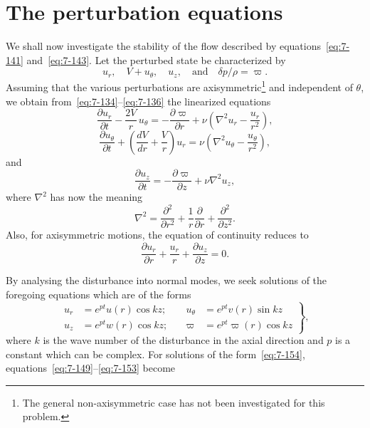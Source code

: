 
\section{The perturbation equations}\label{sec:7-70}
We shall now investigate the stability of the flow described by equations~\eqref{eq:7-141} and~\eqref{eq:7-143}.  Let the perturbed state be characterized by
\begin{equation}
\label{eq:7-148}
u_r, \quad V\!+\!u_\theta, \quad u_z, \quad \text{and} \quad
\delta p/\rho = \varpi.
\end{equation}
Assuming that the various perturbations are axisymmetric\footnote{The general non-axisymmetric case has not been investigated for this problem.} and independent of $\theta$, we obtain from~\eqref{eq:7-134}--\eqref{eq:7-136} the linearized equations
\begin{equation}
\label{eq:7-149}
\frac{\partial u_r}{\partial t}
- \frac{2V}{r}\, u_\theta
= -\frac{\partial \varpi}{\partial r}
+ \nu\!\left(\nabla^2 u_r - \frac{u_r}{r^2}\right),
\end{equation}
\begin{equation}
\label{eq:7-150}
\frac{\partial u_\theta}{\partial t}
+ \left(\frac{dV}{dr}+\frac{V}{r}\right) u_r
= \nu\!\left(\nabla^2 u_\theta - \frac{u_\theta}{r^2}\right),
\end{equation}
and
\begin{equation}
\label{eq:7-151}
\frac{\partial u_z}{\partial t}
= -\frac{\partial \varpi}{\partial z}
+ \nu \nabla^2 u_z,
\end{equation}
where $\nabla^2$ has now the meaning
\begin{equation}
\label{eq:7-152}
\nabla^2 = \frac{\partial^2}{\partial r^2}
+ \frac{1}{r}\frac{\partial}{\partial r}
+ \frac{\partial^2}{\partial z^2}.
\end{equation}
Also, for axisymmetric motions, the equation of continuity reduces to
\begin{equation}
\label{eq:7-153}
\frac{\partial u_r}{\partial r}
+ \frac{u_r}{r}
+ \frac{\partial u_z}{\partial z} = 0.
\end{equation}

By analysing the disturbance into normal modes, we seek solutions
of the foregoing equations which are of the forms
\begin{equation}
\label{eq:7-154}
\left.\begin{aligned}
u_r &= e^{pt}u(r)\cos kz;\quad &
u_\theta &= e^{pt}v(r)\sin kz\\
u_z &= e^{pt}w(r)\cos kz;\quad &
\varpi &= e^{pt}\varpi(r)\cos kz
\end{aligned}\right\},
\end{equation}
where $k$ is the wave number of the disturbance in the axial direction
and $p$ is a constant which can be complex.  For solutions of the form~\eqref{eq:7-154}, equations~\eqref{eq:7-149}--\eqref{eq:7-153} become

